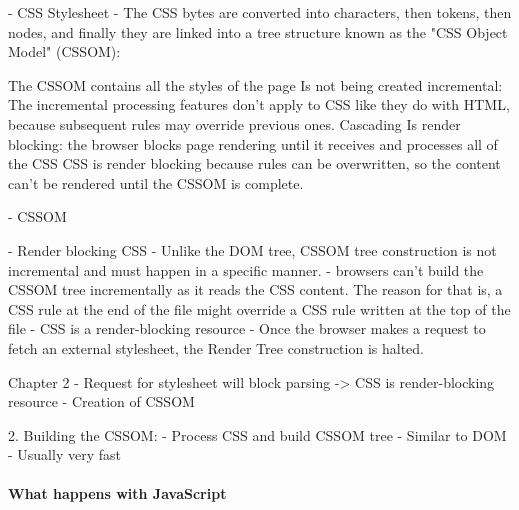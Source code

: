 - CSS Stylesheet
- The CSS bytes are converted into characters, then tokens, then nodes, and finally they are linked into a tree structure known as the "CSS Object Model" (CSSOM):


The CSSOM contains all the styles of the page
Is not being created incremental: The incremental processing features don't apply to CSS like they do with HTML, because subsequent rules may override previous ones. Cascading
Is render blocking: the browser blocks page rendering until it receives and processes all of the CSS
CSS is render blocking because rules can be overwritten, so the content can't be rendered until the CSSOM is complete.



- CSSOM



- Render blocking CSS
- Unlike the DOM tree, CSSOM tree construction is not incremental and must happen in a specific manner.
- browsers can’t build the CSSOM tree incrementally as it reads the CSS content. The reason for that is, a CSS rule at the end of the file might override a CSS rule written at the top of the file
- CSS is a render-blocking resource
- Once the browser makes a request to fetch an external stylesheet, the Render Tree construction is halted.




Chapter 2
- Request for stylesheet will block parsing -> CSS is render-blocking resource
- Creation of CSSOM



2. Building the CSSOM:
- Process CSS and build CSSOM tree
- Similar to DOM
- Usually very fast






\paragraph{What happens with JavaScript}



